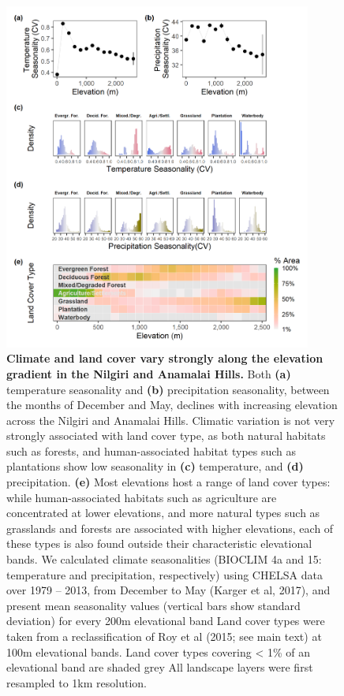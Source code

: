 \begin{figure}[h!]
    \centering
    \includegraphics[width=0.9\textwidth]{figures/hillybirds/fig_02.png}
    \caption{
        \textbf{Climate and land cover vary strongly along the elevation gradient in the Nilgiri and Anamalai Hills.}
        Both \textbf{(a)} temperature seasonality and \textbf{(b)} precipitation seasonality, between the months of December and May, declines with increasing elevation across the Nilgiri and Anamalai Hills. 
        Climatic variation is not very strongly associated with land cover type, as both natural habitats such as forests, and human-associated habitat types such as plantations show low seasonality in \textbf{(c)} temperature, and \textbf{(d)} precipitation.
        \textbf{(e)} Most elevations host a range of land cover types: while human-associated habitats such as agriculture are concentrated at lower elevations, and more natural types such as grasslands and forests are associated with higher elevations, each of these types is also found outside their characteristic elevational bands.
        We calculated climate seasonalities (BIOCLIM 4a and 15: temperature and precipitation, respectively) using CHELSA data over 1979 -- 2013, from December to May (Karger et al, 2017), and present mean seasonality values (vertical bars show standard deviation) for every 200m elevational band
        Land cover types were taken from a reclassification of Roy et al
        (2015; see main text) at 100m elevational bands.
        Land cover types covering < 1\% of an elevational band are shaded grey
        All landscape layers were first resampled to 1km resolution.
    }
    \label{hilly_fig_02}
\end{figure}


